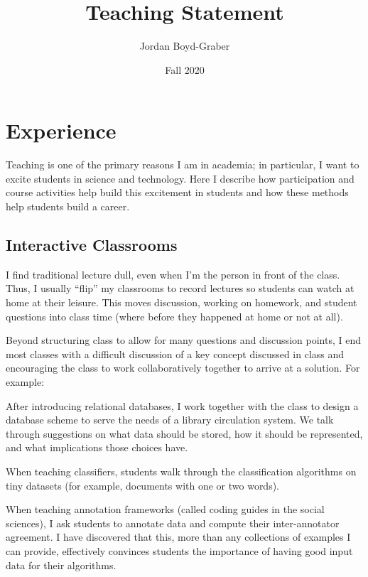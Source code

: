 \documentclass[11pt]{amsart}
\begin{document}
 \title{Teaching Statement}

 \author{Jordan Boyd-Graber}
\address{University of Maryland}

\date{Fall 2020}


\keywords{}

\maketitle

\section{Experience}

Teaching is one of the primary reasons I am in academia; in particular, I want
to excite students in science and technology. Here I describe how
participation and course activities help build this excitement in students and
how these methods help students build a career.

\subsection{Interactive Classrooms}

I find traditional lecture dull, even when I'm the person in front of
the class.  Thus, I usually ``flip'' my classrooms to record
lectures so students can watch at home at their leisure.  This moves
discussion, working on homework, and student questions into class time
(where before they happened at home or not at all).

Beyond structuring class to allow for many questions and discussion
points, I end most classes with a difficult discussion of a key
concept discussed in class and encouraging the class to work
collaboratively together to arrive at a solution.  For example:
\begin{itemize*}
  \item After introducing relational databases, I work together with the class to
design a database scheme to serve the needs of a library circulation
system.  We talk through suggestions on what data should be stored,
how it should be represented, and what implications those choices
have.
  \item When teaching classifiers, students walk through the classification
    algorithms on tiny datasets (for example, documents with one or two words).
  \item When teaching annotation frameworks (called coding guides in the
    social sciences), I ask students to annotate data and
    compute their inter-annotator agreement.  I have discovered that this, more
    than any collections of examples I can provide, effectively convinces
    students the importance of having good input data for their algorithms.
\end{itemize*}
\end{document}
